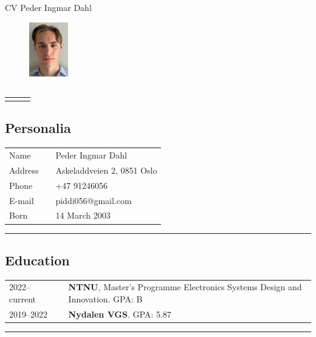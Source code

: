 \documentclass[10pt]{article}
\newlength{\cw}
\newlength{\cwl}
\begin{document}
\begin{center}
\Large{CV Peder Ingmar Dahl}
\end{center}


\begin{figure}
  \begin{center}
    \includegraphics[width=0.15\textwidth]{Vedlegg/cv_pp.png}
  \end{center}
\end{figure}

\subsection*{}
\begin{tabular}{p{\cw} @{ }l p{\cwl}}
 & & \\ 
\end{tabular}
\vspace{0.2cm}

\subsection*{Personalia}
\begin{tabular}{p{\cw} @{:}l p{\cwl}}
Name & & Peder Ingmar Dahl \\
Address & & Askeladdveien 2, 0851 Oslo\\
Phone & & +47 91246056\\ 
E-mail & & piddi056@gmail.com \\
Born & & 14 March 2003 
\end{tabular}
\vspace{0.1cm}
\hrule
\vspace{0.1cm}

\subsection*{Education}
\begin{tabular}{p{\cw} @{:}l p{\cwl}}
  2022--current & & \textbf{NTNU}, Master's Programme Electronics Systems Design and Innovation. GPA: B \\
  2019--2022 & & \textbf{Nydalen VGS}. GPA: 5.87 \\ 
\end{tabular}
\vspace{0.1cm}
\hrule
\vspace{0.1cm}
\end{document}
